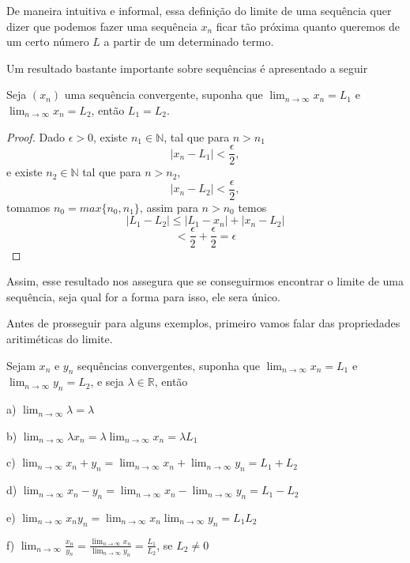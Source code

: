 De maneira intuitiva e informal, essa definição do limite de uma sequência quer
dizer que podemos fazer uma sequência $x_n$ ficar tão próxima quanto queremos de
um certo número $L$ a partir de um determinado termo.

Um resultado bastante importante sobre sequências é apresentado a seguir

\begin{teo}\label{teo:Unicidade do limite} Seja $(x_n)$ uma
    sequência convergente, suponha que $\lim_{n \to \infty} x_n = L_1$ e 
    $\lim_{n \to \infty} x_n = L_2$, então $L_1 = L_2$.
\end{teo}

\begin{proof}
    Dado $\epsilon > 0$, existe $n_1 \in \mathbb{N}$, tal que para $n>n_1$
    $$|x_n - L_1| < \frac{\epsilon}{2},$$
    e existe $n_2 \in \mathbb{N}$ tal que para $n>n_2$, 
    $$|x_n - L_2| < \frac{\epsilon}{2},$$
    tomamos $n_0 = max\{n_0,n_1 \}$, assim para $n > n_0$ temos
    $$|L_1-L_2| \leq |L_1 - x_n| + |x_n - L_2|$$
    $$ < \frac{\epsilon}{2} + \frac{\epsilon}{2} = \epsilon$$
\end{proof}

Assim, esse resultado nos assegura que se conseguirmos encontrar o limite de uma
sequência, seja qual for a forma para isso, ele sera único.

Antes de prosseguir para alguns exemplos, primeiro vamos falar das propriedades 
aritiméticas do limite.

\begin{teo}\label{teo:Propriedades} Sejam $x_n$ e $y_n$
    sequências convergentes, suponha que $\lim_{n \to \infty} x_n = L_1$ e
    $\lim_{n \to \infty} y_n = L_2$, e seja $\lambda \in \mathbb{R}$, então
    \item  [a)] $\lim_{n \to \infty} \lambda = \lambda$
    \item  [b)] $\lim_{n \to \infty}\lambda x_n = \lambda \lim_{n \to \infty} x_n = \lambda L_1$
    \item  [c)] $\lim_{n \to \infty} x_n + y_n = \lim_{n \to \infty} x_n + \lim_{n \to \infty} y_n = L_1 + L_2$
    \item  [d)] $\lim_{n \to \infty} x_n - y_n = \lim_{n \to \infty} x_n - \lim_{n \to \infty} y_n = L_1 - L_2$
    \item  [e)] $\lim_{n \to \infty} x_n y_n = \lim_{n \to \infty} x_n \lim_{n \to \infty} y_n = L_1 L_2$
    \item  [f)] $\lim_{n \to \infty} \frac{x_n}{y_n} = \frac{\lim_{n \to \infty} x_n}{\lim_{n \to \infty} y_n} 
    = \frac{L_1}{L_2}$, se $L_2 \neq 0$
\end{teo}

